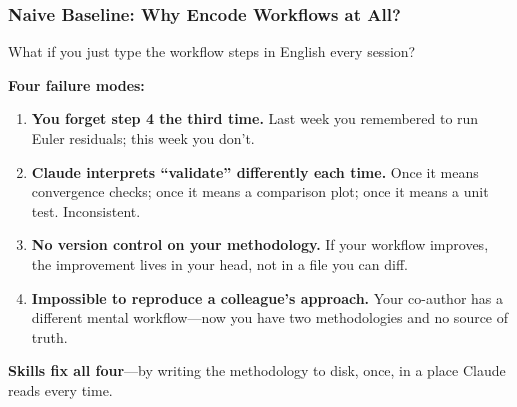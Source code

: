 \documentclass[10pt,english,aspectratio=169]{beamer}
\begin{document}
\begin{frame}
\frametitle{Naive Baseline: Why Encode Workflows at All?}

What if you just type the workflow steps in English every session?

\vspace{0.3cm}

\textbf{Four failure modes:}
\begin{enumerate}
    \item \textbf{You forget step 4 the third time.} Last week you remembered to run Euler residuals; this week you don't.
    \vspace{0.1cm}
    \item \textbf{Claude interprets ``validate'' differently each time.} Once it means convergence checks; once it means a comparison plot; once it means a unit test. Inconsistent.
    \vspace{0.1cm}
    \item \textbf{No version control on your methodology.} If your workflow improves, the improvement lives in your head, not in a file you can diff.
    \vspace{0.1cm}
    \item \textbf{Impossible to reproduce a colleague's approach.} Your co-author has a different mental workflow---now you have two methodologies and no source of truth.
\end{enumerate}

\vspace{0.3cm}

\textbf{Skills fix all four}---by writing the methodology to disk, once, in a place Claude reads every time.
\end{frame}
\end{document}
